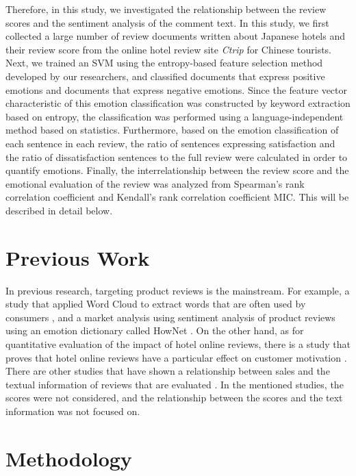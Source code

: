 \documentclass[review]{elsarticle}
\begin{document}
Therefore, in this study, we investigated the relationship between the review scores and the sentiment analysis of the comment text. In this study, we first collected a large number of review documents written about Japanese hotels and their review score from the online hotel review site \textit{Ctrip} for Chinese tourists. Next, we trained an SVM using the entropy-based feature selection method developed by our researchers, and classified documents that express positive emotions and documents that express negative emotions. Since the feature vector characteristic of this emotion classification was constructed by keyword extraction based on entropy, the classification was performed using a language-independent method based on statistics. Furthermore, based on the emotion classification of each sentence in each review, the ratio of sentences expressing satisfaction and the ratio of dissatisfaction sentences to the full review were calculated in order to quantify emotions. Finally, the interrelationship between the review score and the emotional evaluation of the review was analyzed from Spearman's rank correlation coefficient and Kendall's rank correlation coefficient MIC. This will be described in detail below.

\section{Previous Work}\label{lit_rev}

In previous research, targeting product reviews is the mainstream. For example, a study that applied Word Cloud to extract words that are often used by consumers \cite[][]{hargreaves2015}, and a market analysis using sentiment analysis of product reviews using an emotion dictionary called HowNet \cite[][]{zhang2011feature}. On the other hand, as for quantitative evaluation of the impact of hotel online reviews, there is a study that proves that hotel online reviews have a particular effect on customer motivation \cite[][]{VERMEULEN2009123}. There are other studies that have shown a relationship between sales and the textual information of reviews that are evaluated \cite[][]{basuroy2003}. In the mentioned studies, the scores were not considered, and the relationship between the scores and the text information was not focused on.

\section{Methodology}\label{methodology}
\end{document}
